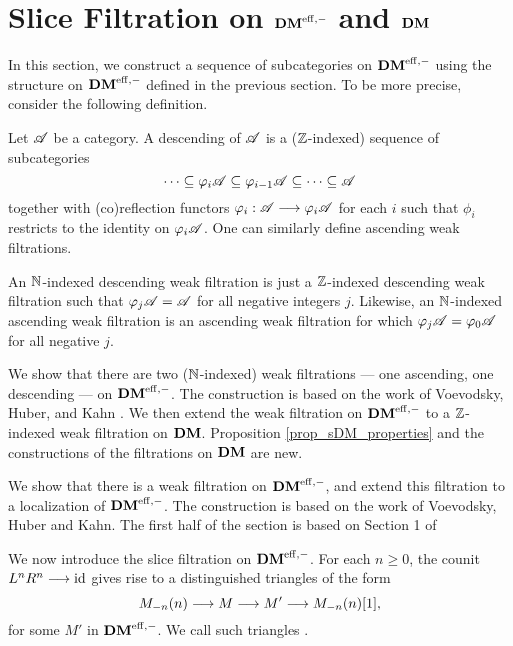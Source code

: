 \newpage
\section{Slice Filtration on $\DMeff$ and $\DM$}\label{sect_slice_filt_dm}

In this section, we construct a sequence of subcategories on 
$\DMeff$ using the structure on $\DMeff$ defined in the previous
section. To be more precise, consider the following definition.

\begin{defn}\label{def_cat_filtration}
Let $\Cat{A}$ be a category. A descending  of 
$\Cat{A}$ is a ($\Z$-indexed) sequence of subcategories
\[
\cdots \subseteq \phi_i\Cat{A} \subseteq \phi_{i - 1}\Cat{A} 
   \subseteq \cdots \subseteq \Cat{A}
\]
together with (co)reflection functors $\phi_i: \Cat{A} \to 
\phi_i\Cat{A}$ for each $i$ such that $\phi_i$ restricts to 
the identity on $\phi_i\Cat{A}$. One can similarly define
ascending weak filtrations.
\end{defn}

\begin{rmk}
An $\N$-indexed descending weak filtration is just a $\Z$-indexed 
descending weak filtration such that $\phi_{j}\Cat{A} = \Cat{A}$
for all negative integers $j$. Likewise, an $\N$-indexed ascending 
weak filtration is an ascending weak filtration for which
$\phi_{j}\Cat{A} = \phi_{0}\Cat{A}$ for all negative $j$.
\end{rmk}

We show that there are two ($\N$-indexed) weak filtrations --- 
one ascending, one descending --- on $\DMeff$. The construction 
is based on the work of Voevodsky, Huber, and Kahn \cite{HuKa}. 
We then extend the weak filtration on $\DMeff$ to a $\Z$-indexed
weak filtration on $\DM$. Proposition \ref{prop_sDM_properties}
and the constructions of the filtrations on $\DM$ are new.

We show that there is a weak filtration on $\DMeff$, and extend 
this filtration to a localization of $\DMeff$. The construction
is based on the work of Voevodsky, Huber and Kahn. The first half
of the section is based on Section 1 of \cite{HuKa}

We now introduce the slice filtration on $\DMeff$. For each 
$n \geq 0$, the counit $\LDMf{n}\RDMf{n} \to \id$ gives rise to a 
distinguished triangles of the form
\begin{equation}\label{eq_slice_triangle_1}
\tZ[n]{\hZ[n]{M}} \to M \to M' \to \tZ[n]{\hZ[n]{M}}[1],
\end{equation}
for some $M'$ in $\DMeff$. We call such triangles .

